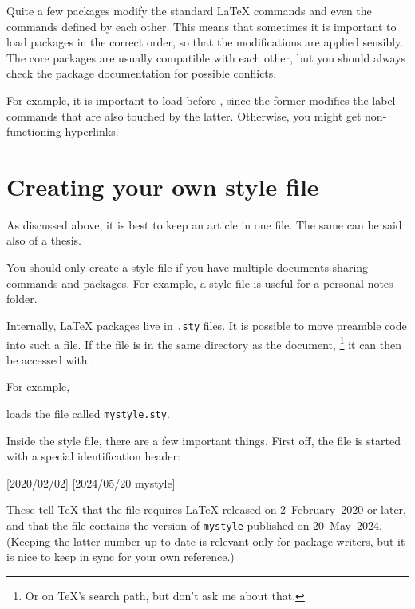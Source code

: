 \begin{gotcha}
Quite a few packages modify the standard \LaTeX{} commands
and even the commands defined by each other.
This means that sometimes it is important to load packages in the correct order,
so that the modifications are applied sensibly.
The core packages are usually compatible with each other,
but you should always check the package documentation for possible conflicts.

For example, it is important to load  before ,
since the former modifies the label commands that are also touched by the latter.
Otherwise, you might get non-functioning hyperlinks.
\end{gotcha}



\section{Creating your own style file}

\begin{practices}
As discussed above, it is best to keep an article in one file.
The same can be said also of a thesis.

You should only create a style file if you have multiple documents sharing commands and packages.
For example, a style file is useful for a personal notes folder.
\end{practices}


Internally, \LaTeX{} packages live in \verb|.sty| files.
It is possible to move preamble code into such a file.
If the file is in the same directory as the document,%
\footnote{Or on \TeX's search path, but don't ask me about that.}
it can then be accessed with .

For example,
\begin{ExampleCode}
\usepackage{mystyle}
\end{ExampleCode}
loads the file called \verb|mystyle.sty|.


Inside the style file, there are a few important things.
First off, the file is started with a special identification header:
%
\begin{ExampleCode}
[2020/02/02]
[2024/05/20 mystyle]
\end{ExampleCode}
%
These tell \TeX{} that the file requires \LaTeX{} released on 2~February~2020 or later,
and that the file contains the version of \verb|mystyle| published on 20~May~2024.
(Keeping the latter number up to date is relevant only for package writers,
but it is nice to keep in sync for your own reference.)

